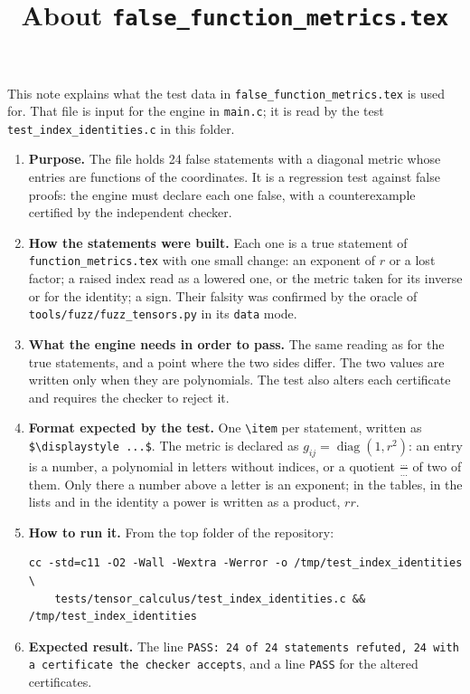 \documentclass[11pt,a4paper]{article}
\title{About \texttt{false\_function\_metrics.tex}}
\author{}
\date{}
\begin{document}
\maketitle
This note explains what the test data in \texttt{false\_function\_metrics.tex} is used for. That file is input for the engine in \texttt{main.c}; it is read by the test \texttt{test\_index\_identities.c} in this folder.

\begin{enumerate}
\item \textbf{Purpose.} The file holds 24 false statements with a diagonal metric whose entries are functions of the coordinates. It is a regression test against false proofs: the engine must declare each one false, with a counterexample certified by the independent checker.

\item \textbf{How the statements were built.} Each one is a true statement of \texttt{function\_metrics.tex} with one small change: an exponent of $r$ or a lost factor; a raised index read as a lowered one, or the metric taken for its inverse or for the identity; a sign. Their falsity was confirmed by the oracle of \texttt{tools/fuzz/fuzz\_tensors.py} in its \texttt{data} mode.

\item \textbf{What the engine needs in order to pass.} The same reading as for the true statements, and a point where the two sides differ. The two values are written only when they are polynomials. The test also alters each certificate and requires the checker to reject it.

\item \textbf{Format expected by the test.} One \texttt{\textbackslash item} per statement, written as \texttt{\$\textbackslash displaystyle ...\$}. The metric is declared as $g_{ij} = \operatorname{diag}(1, r^{2})$: an entry is a number, a polynomial in letters without indices, or a quotient $\frac{\dots}{\dots}$ of two of them. Only there a number above a letter is an exponent; in the tables, in the lists and in the identity a power is written as a product, $r r$.

\item \textbf{How to run it.} From the top folder of the repository:
\begin{verbatim}
cc -std=c11 -O2 -Wall -Wextra -Werror -o /tmp/test_index_identities \
    tests/tensor_calculus/test_index_identities.c && /tmp/test_index_identities
\end{verbatim}

\item \textbf{Expected result.} The line \texttt{PASS: 24 of 24 statements refuted, 24 with a certificate the checker accepts}, and a line \texttt{PASS} for the altered certificates.

\end{enumerate}
\end{document}
